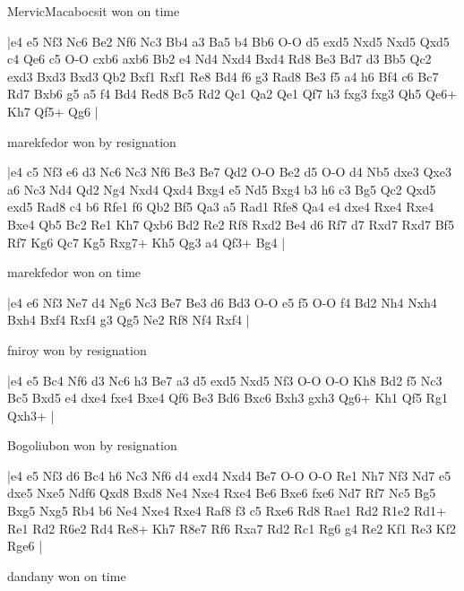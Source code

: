 \showboard

MervicMacabocsit won on time

\makegametitle
|e4 e5 Nf3 Nc6 Be2 Nf6 Nc3 Bb4 a3 Ba5 b4 Bb6 O-O d5 exd5 Nxd5 Nxd5 Qxd5 c4 Qe6 c5 O-O cxb6 axb6 Bb2 e4 Nd4 Nxd4 Bxd4 Rd8 Be3 Bd7 d3 Bb5 Qc2 exd3 Bxd3 Bxd3 Qb2 Bxf1 Rxf1 Re8 Bd4 f6 g3 Rad8 Be3 f5 a4 h6 Bf4 c6 Bc7 Rd7 Bxb6 g5 a5 f4 Bd4 Red8 Bc5 Rd2 Qc1 Qa2 Qe1 Qf7 h3 fxg3 fxg3 Qh5 Qe6+ Kh7 Qf5+ Qg6  |

\showboard

marekfedor won by resignation

\makegametitle
|e4 c5 Nf3 e6 d3 Nc6 Nc3 Nf6 Be3 Be7 Qd2 O-O Be2 d5 O-O d4 Nb5 dxe3 Qxe3 a6 Nc3 Nd4 Qd2 Ng4 Nxd4 Qxd4 Bxg4 e5 Nd5 Bxg4 b3 h6 c3 Bg5 Qc2 Qxd5 exd5 Rad8 c4 b6 Rfe1 f6 Qb2 Bf5 Qa3 a5 Rad1 Rfe8 Qa4 e4 dxe4 Rxe4 Rxe4 Bxe4 Qb5 Bc2 Re1 Kh7 Qxb6 Bd2 Re2 Rf8 Rxd2 Be4 d6 Rf7 d7 Rxd7 Rxd7 Bf5 Rf7 Kg6 Qc7 Kg5 Rxg7+ Kh5 Qg3 a4 Qf3+ Bg4  |

\showboard

marekfedor won on time

\makegametitle
|e4 e6 Nf3 Ne7 d4 Ng6 Nc3 Be7 Be3 d6 Bd3 O-O e5 f5 O-O f4 Bd2 Nh4 Nxh4 Bxh4 Bxf4 Rxf4 g3 Qg5 Ne2 Rf8 Nf4 Rxf4  |

\showboard

fniroy won by resignation

\makegametitle
|e4 e5 Bc4 Nf6 d3 Nc6 h3 Be7 a3 d5 exd5 Nxd5 Nf3 O-O O-O Kh8 Bd2 f5 Nc3 Bc5 Bxd5 e4 dxe4 fxe4 Bxe4 Qf6 Be3 Bd6 Bxc6 Bxh3 gxh3 Qg6+ Kh1 Qf5 Rg1 Qxh3+  |

\showboard

Bogoliubon won by resignation

\makegametitle
|e4 e5 Nf3 d6 Bc4 h6 Nc3 Nf6 d4 exd4 Nxd4 Be7 O-O O-O Re1 Nh7 Nf3 Nd7 e5 dxe5 Nxe5 Ndf6 Qxd8 Bxd8 Ne4 Nxe4 Rxe4 Be6 Bxe6 fxe6 Nd7 Rf7 Nc5 Bg5 Bxg5 Nxg5 Rb4 b6 Ne4 Nxe4 Rxe4 Raf8 f3 c5 Rxe6 Rd8 Rae1 Rd2 R1e2 Rd1+ Re1 Rd2 R6e2 Rd4 Re8+ Kh7 R8e7 Rf6 Rxa7 Rd2 Rc1 Rg6 g4 Re2 Kf1 Re3 Kf2 Rge6  |

\showboard

dandany won on time

